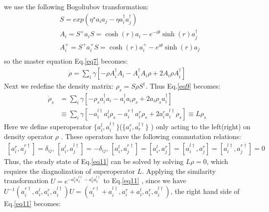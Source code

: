 \documentclass{article}
\begin{document}
we use the following Bogoliubov transformation\cite{Bogoliubov}:
\begin{equation}
\label{eq8}
\begin{split}
&S=exp(\eta^{\star}a_{i}a_{j}-\eta a_{i}^{\dagger}a_{j}^{\dagger})\\
&A_{i}=S^{+}a_{i}S=\cosh(r)a_{i}-e^{-i\theta}\sinh(r)a_{j}^{\dagger} \\
&A_{i}^{+}=S^{+}a_{i}^{+}S=\cosh(r)a_{i}^{+}-e^{i\theta}\sinh(r)a_{j}\\
\end{split}
\end{equation}
so the master equation Eq.\eqref{eq7} becomes:
\begin{equation}
\label{eq9}
\begin{split}
\dot{\rho}=\sum_{i}\gamma[-\rho A_{i}^{\dagger}A_{i}-A_{i}^{\dagger}A_{i}\rho+2A_{i}\rho A_{i}^{\dagger}]
\end{split}
\end{equation}
Next we redefine the density matrix: $\rho_{s}=S\rho S^{\dagger}$. Thus Eq.\eqref{eq9} becomes:
\begin{equation}
\label{eq11}
\begin{split}
\dot{\rho}_{s}&=\sum_{i}\gamma[-\rho_{s}a_{i}^{\dagger}a_{i}-a_{i}^{\dagger}a_{i}\rho_{s}+2a_{i}\rho_{s}a_{i}^{\dagger}]\\
&\equiv\sum_{i}\gamma[-a_{i}^{l\dagger}a_{i}^{l}\rho_{s}-a_{i}^{r\dagger}a_{i}^{r}\rho_{s}+2a_{i}^{r}a_{i}^{l\dagger}\rho_{s}]\equiv L\rho_{s}
\end{split}
\end{equation}
Here we define superoperator $\{a_{i}^{l}, a_{i}^{l\dagger}\}$($\{a_{i}^{r}, a_{r}^{l\dagger}\}$ ) only acting to the left(right) on density operator $\rho$ \cite{Wang2002, An}. These operators have the following commutation relations: 
\begin{equation}
\label{eq12}
\begin{split}
[a_{i}^{r},a_{j}^{r\dagger}]=\delta_{ij},\,[a_{i}^{l},a_{j}^{l\dagger}]=-\delta_{ij},\,[a_{i}^{l},a_{j}^{r\dagger}]=[a_{i}^{l},a_{j}^{r}]=[a_{i}^{l\dagger},a_{j}^{r}]=[a_{i}^{l\dagger},a_{j}^{r\dagger}]=0
\end{split}
\end{equation}
Thus, the steady state of Eq.\eqref{eq11} can be solved by solving $L\rho=0$, which requires the diagnolization of superoperator $L$. Applying the similarity transformation $U=e^{-a_{1}^{r}a_{1}^{l\dagger}-a_{2}^{r}a_{2}^{l\dagger}}$ to Eq.\eqref{eq11} , since we have $U^{-1}(a_{i}^{r\dagger},a_{i}^{l},a_{i}^{r},a_{i}^{l\dagger})U=(a_{i}^{r\dagger}+a_{i}^{l\dagger},a_{i}^{r}+a_{i}^{l},a_{i}^{r},a_{i}^{l\dagger})$, the right hand side of Eq.\eqref{eq11} becomes:
\end{document}
